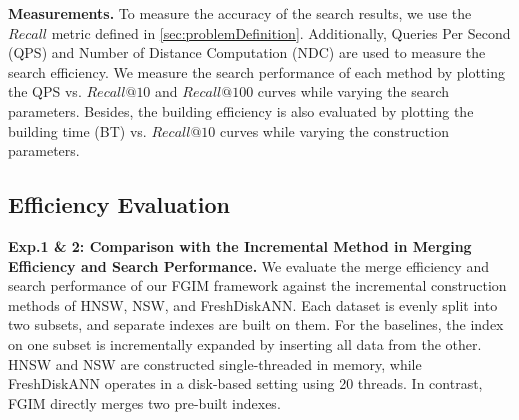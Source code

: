 \documentclass[acmsmall]{acmart}
\theoremstyle{remark}
\theoremstyle{definition}
\begin{document}
\noindent\textbf{Measurements.} 
To measure the accuracy of the search results, we use the $Recall$ metric defined in \textsection\ref{sec:problemDefinition}. Additionally, Queries Per Second (QPS) and Number of Distance Computation (NDC) are used to measure the search efficiency. We measure the search performance of each method by plotting the QPS vs. $Recall@10$ and $Recall@100$ curves while varying the search parameters. Besides, the building efficiency is also evaluated by plotting the building time (BT) vs. $Recall@10$ curves while varying the construction parameters.

\subsection{Efficiency Evaluation}
\label{subsec:efficiency}

\noindent\textbf{Exp.1 \& 2: Comparison with the Incremental Method in Merging Efficiency and Search Performance.} We evaluate the merge efficiency and search performance of our FGIM framework against the incremental construction methods of HNSW, NSW, and FreshDiskANN. Each dataset is evenly split into two subsets, and separate indexes are built on them. For the baselines, the index on one subset is incrementally expanded by inserting all data from the other. HNSW and NSW are constructed single-threaded in memory, while FreshDiskANN operates in a disk-based setting using 20 threads. In contrast, FGIM directly merges two pre-built indexes.
\end{document}
